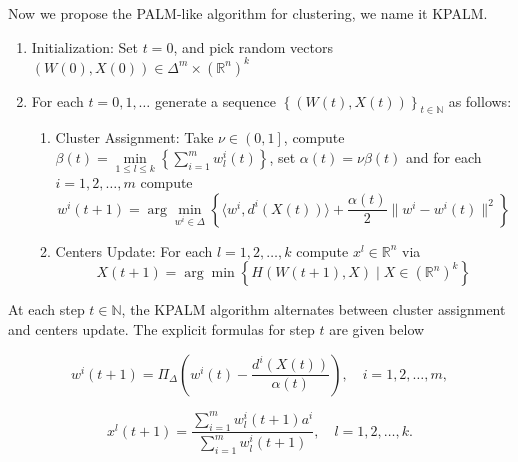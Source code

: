 \documentclass[11pt]{article}
\numberwithin{equation}{section}
\begin{document}
Now we propose the PALM-like algorithm for clustering, we name it KPALM.
\begin{enumerate}[(1)]
	\item Initialization: Set $t=0$, and pick random vectors $(W(0),X(0)) \in \Delta^m \times (\mathbb{R}^n)^k$

	\item For each $t=0,1, \ldots$ generate a sequence $\left\lbrace(W(t),X(t))\right\rbrace_{t \in \mathbb{N}}$ as follows:
	\begin{enumerate}[(2.1)]
		\item Cluster Assignment: Take $\nu \in \left(0,1\right]$, compute $\beta(t) = \min\limits_{1 \leq l \leq k} \left\lbrace \sum\limits_{i=1}^{m} w^i_l(t)\right \rbrace$, set
		$\alpha(t)=\nu \beta(t) $ and for each $i=1, 2, \ldots ,m$ compute
		\begin{equation}
			w^i(t+1) = \arg\min\limits_{w^i \in \Delta} \left\lbrace \langle w^i , d^i(X(t)) \rangle + \frac{\alpha(t)}{2} \|w^i - w^i(t)\|^2 \right\rbrace \label{StateEq5}
		\end{equation}
		
		\item Centers Update: For each $l=1, 2, \ldots ,k$ compute $x^l \in \mathbb{R}^n$ via
		\begin{equation}
			X(t+1) = \arg\min \left\lbrace H(W(t+1), X) \mid X \in (\mathbb{R}^n)^k \right\rbrace \label{StateEq6}
		\end{equation}
	\end{enumerate}
\end{enumerate}

\newpage

At each step $t \in \mathbb{N}$, the KPALM algorithm alternates between cluster assignment and centers update. The explicit formulas for step $t$ are given below

\begin{equation}
w^i(t+1) = \Pi_{\Delta} \left(w^i(t) - \frac{d^i(X(t))}{\alpha(t)}\right) , \quad i=1, 2, \ldots ,m , \label{StateEq7}
\end{equation}

\begin{equation}
x^l(t+1) = \frac{\sum_{i=1}^{m} w^i_l(t+1) a^i}{\sum_{i=1}^{m} w^i_l(t+1)} , \quad l=1, 2, \ldots ,k . \label{StateEq8}
\end{equation}
\end{document}
